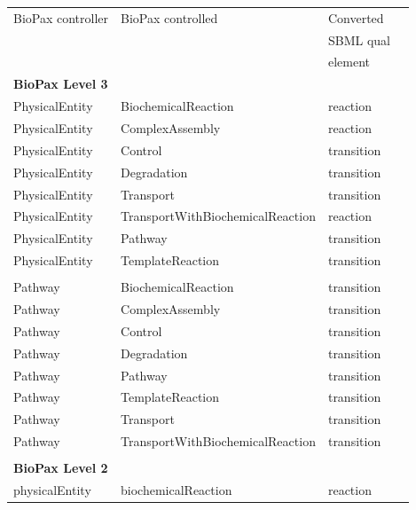 \documentclass{bioinfo}
\begin{document}
\begin{methods}
\begin{table}[t!h]
{\begin{tabular}{llll}\toprule
BioPax controller & BioPax controlled               & Converted\\
                  &                                 & SBML qual\\
                  &                                 & element\\
\midrule
\textbf{BioPax Level 3}\\
\midrule
PhysicalEntity & BiochemicalReaction                & reaction\\
PhysicalEntity & ComplexAssembly                    & reaction\\
PhysicalEntity & Control                            & transition\\
PhysicalEntity & Degradation                        & transition\\
PhysicalEntity & Transport                          & transition\\
PhysicalEntity & TransportWithBiochemicalReaction   & reaction\\
PhysicalEntity & Pathway                            & transition\\
PhysicalEntity & TemplateReaction                   & transition\\
\\
Pathway         & BiochemicalReaction               & transition\\
Pathway         & ComplexAssembly                   & transition\\
Pathway         & Control                           & transition\\
Pathway         & Degradation                       & transition\\
Pathway         & Pathway                           & transition\\
Pathway         & TemplateReaction                  & transition\\
Pathway         & Transport                         & transition\\
Pathway         & TransportWithBiochemicalReaction  & transition\\
\\\midrule
\textbf{BioPax Level 2}\\
\midrule
physicalEntity & biochemicalReaction                & reaction\\

\end{tabular}}
\end{table}
\end{methods}
\end{document}
